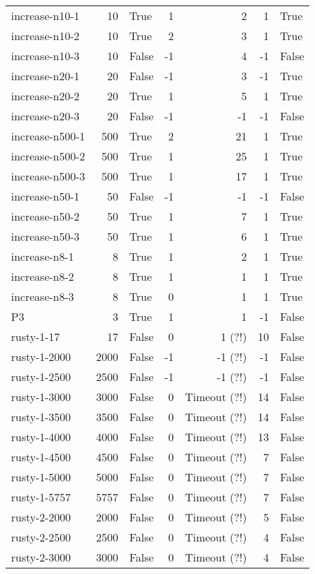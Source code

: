 \begin{longtable}{lrlrrrl}
increase-n10-1 & 10 & True & 1 & 2 & 1 & True \\
increase-n10-2 & 10 & True & 2 & 3 & 1 & True \\
increase-n10-3 & 10 & False & -1 & 4 & -1 & False \\
increase-n20-1 & 20 & False & -1 & 3 & -1 & True \\
increase-n20-2 & 20 & True & 1 & 5 & 1 & True \\
increase-n20-3 & 20 & False & -1 & -1 & -1 & False \\
increase-n500-1 & 500 & True & 2 & 21 & 1 & True \\
increase-n500-2 & 500 & True & 1 & 25 & 1 & True \\
increase-n500-3 & 500 & True & 1 & 17 & 1 & True \\
increase-n50-1 & 50 & False & -1 & -1 & -1 & False \\
increase-n50-2 & 50 & True & 1 & 7 & 1 & True \\
increase-n50-3 & 50 & True & 1 & 6 & 1 & True \\
increase-n8-1 & 8 & True & 1 & 2 & 1 & True \\
increase-n8-2 & 8 & True & 1 & 1 & 1 & True \\
increase-n8-3 & 8 & True & 0 & 1 & 1 & True \\
P3 & 3 & True & 1 & 1 & -1 & False \\
rusty-1-17 & 17 & False & 0 & 1 (?!) & 10 & False \\
rusty-1-2000 & 2000 & False & -1 & -1 (?!) & -1 & False \\
rusty-1-2500 & 2500 & False & -1 & -1 (?!) & -1 & False \\
rusty-1-3000 & 3000 & False & 0 & Timeout (?!) & 14 & False \\
rusty-1-3500 & 3500 & False & 0 & Timeout (?!) & 14 & False \\
rusty-1-4000 & 4000 & False & 0 & Timeout (?!) & 13 & False \\
rusty-1-4500 & 4500 & False & 0 & Timeout (?!) & 7 & False \\
rusty-1-5000 & 5000 & False & 0 & Timeout (?!) & 7 & False \\
rusty-1-5757 & 5757 & False & 0 & Timeout (?!) & 7 & False \\
rusty-2-2000 & 2000 & False & 0 & Timeout (?!) & 5 & False \\
rusty-2-2500 & 2500 & False & 0 & Timeout (?!) & 4 & False \\
rusty-2-3000 & 3000 & False & 0 & Timeout (?!) & 4 & False \\

\end{longtable}
